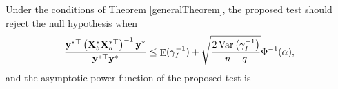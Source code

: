 \documentclass[smallextended]{svjour3}       %
\DeclareMathOperator{\myE}{E}
\DeclareMathOperator{\myVar}{Var}
\DeclareMathOperator{\myCov}{Cov}
\newcommand{\By}{\mathbf{y}}    \newcommand{\Bz}{\mathbf{z}}
\begin{document}
\begin{theorem}

\end{theorem}
Under the conditions of Theorem \ref{generalTheorem}, the proposed test should reject the null hypothesis when
\begin{equation*}
        \frac{
            \By^{*\top} \left( \BX_b^* \BX_b^{*\top} \right)^{-1} \By^*
        }{
            \By^{*\top} \By^*
        } 
        \leq 
        \myE (\gamma_I^{-1})
        +\sqrt{
            \frac{2\myVar\left( \gamma_I^{-1} \right)}{n-q} 
        }
        \Phi^{-1}(\alpha),
\end{equation*}
and the asymptotic power function of the proposed test is
\end{document}
